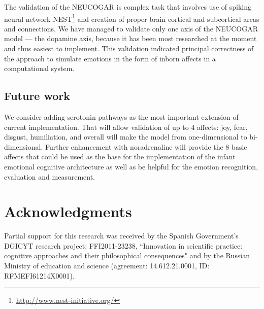 \documentclass[procedia]{easychair}
\begin{document}
The validation of the NEUCOGAR is complex task that involves use of spiking neural network
NEST\footnote{\url{http://www.nest-initiative.org/}} and creation
of proper brain cortical and subcortical areas and connections. We have managed to validate only one axis
of the NEUCOGAR model --- the dopamine axis, because it has been most researched
at the moment and thus easiest to implement. This validation indicated principal
correctness of the approach to simulate emotions in the form of inborn affects
in a computational system.

\subsection{Future work}

We consider adding serotonin pathways as the most important extension of current implementation.
That will allow validation of up to 4 affects: joy, fear, disgust, humiliation,
and overall will make the model from one-dimensional to bi-dimensional.
Further enhancement with noradrenaline will provide the 8 basic affects that
could be used as the base for the implementation of the infant emotional cognitive
architecture as well as be helpful for the emotion recognition, evaluation and measurement.

\section*{Acknowledgments}

Partial support for this research was received by the Spanish Government's DGICYT research project: FFI2011-23238, ``Innovation in scientific practice: cognitive approaches and their philosophical consequences" and by the Russian Ministry of education and science (agreement: 14.612.21.0001, ID: RFMEFI61214X0001).




\end{document}

